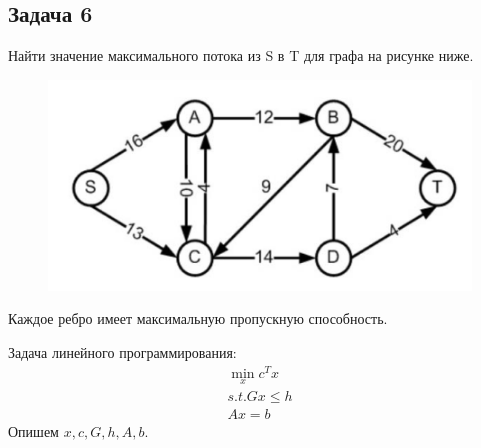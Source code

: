 \documentclass{article}
\begin{document}
    \newpage
    
    \subsection*{Задача 6}
    Найти значение максимального потока из S в T для графа на рисунке ниже.
    \begin{figure}[h!]
        \includegraphics[width=0.8\linewidth]{Screenshots/graph6.png}
    \end{figure}
    Каждое ребро имеет максимальную пропускную способность.
    
    \bigbreak
    Задача линейного программирования:
    \begin{align*}
        \min_x c^Tx\\
        s.t. Gx \le h\\
        Ax = b
    \end{align*}
    Опишем $x, c, G, h, A, b$.
    
\end{document}
